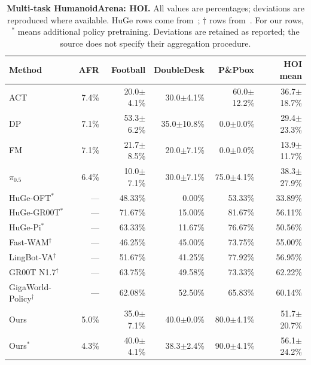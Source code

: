 \begin{table}[t]
\centering\small
\caption{\textbf{Multi-task HumanoidArena: HOI.} All values are percentages; deviations are reproduced where available. HuGe rows come from~\cite{liu2026huge}; $\dagger$ rows from~\cite{li2026languageforcing}. For our rows, $^{*}$ means additional policy pretraining. Deviations are retained as reported; the source does not specify their aggregation procedure.}
\label{tab:supp_multi_hoi}
\setlength{\tabcolsep}{4pt}
\begin{tabular}{lrrrrr}\toprule
Method & AFR & Football & DoubleDesk & P\&Pbox & HOI mean\\\midrule
ACT & 7.4\% & 20.0$\pm$4.1\% & 30.0$\pm$4.1\% & 60.0$\pm$12.2\% & 36.7$\pm$18.7\%\\
DP & 7.1\% & 53.3$\pm$6.2\% & 35.0$\pm$10.8\% & 0.0$\pm$0.0\% & 29.4$\pm$23.3\%\\
FM & 7.1\% & 21.7$\pm$8.5\% & 20.0$\pm$7.1\% & 0.0$\pm$0.0\% & 13.9$\pm$11.7\%\\
$\pi_{0.5}$ & 6.4\% & 10.0$\pm$7.1\% & 30.0$\pm$7.1\% & 75.0$\pm$4.1\% & 38.3$\pm$27.9\%\\
HuGe-OFT$^{*}$ & --- & 48.33\% & 0.00\% & 53.33\% & 33.89\%\\
HuGe-GR00T$^{*}$ & --- & 71.67\% & 15.00\% & 81.67\% & 56.11\%\\
HuGe-Pi$^{*}$ & --- & 63.33\% & 11.67\% & 76.67\% & 50.56\%\\
Fast-WAM$^{\dagger}$ & --- & 46.25\% & 45.00\% & 73.75\% & 55.00\%\\
LingBot-VA$^{\dagger}$ & --- & 51.67\% & 41.25\% & 77.92\% & 56.95\%\\
GR00T N1.7$^{\dagger}$ & --- & 63.75\% & 49.58\% & 73.33\% & 62.22\%\\
GigaWorld-Policy$^{\dagger}$ & --- & 62.08\% & 52.50\% & 65.83\% & 60.14\%\\
Ours & 5.0\% & 35.0$\pm$7.1\% & 40.0$\pm$0.0\% & 80.0$\pm$4.1\% & 51.7$\pm$20.7\%\\
Ours$^{*}$ & 4.3\% & 40.0$\pm$4.1\% & 38.3$\pm$2.4\% & 90.0$\pm$4.1\% & 56.1$\pm$24.2\%\\
\bottomrule\end{tabular}\end{table}
